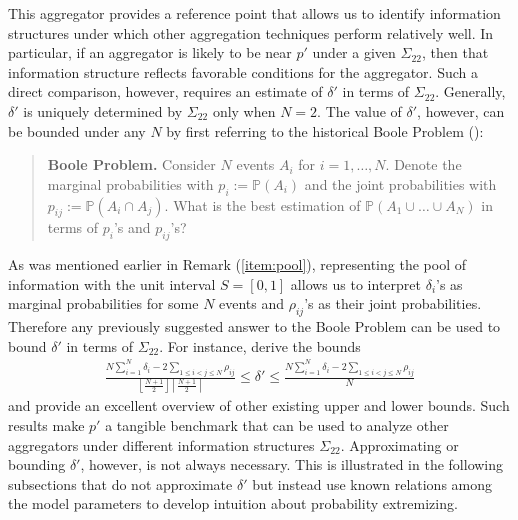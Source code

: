 \documentclass[11pt]{article}
\renewcommand{\P}{\mathbb{P}}
\theoremstyle{definition}
\theoremstyle{definition}
\def\P{{\mathbb P}}
\begin{document}
This aggregator provides a reference point that allows us to identify information structures under which other aggregation techniques perform relatively well. In particular, if an aggregator is likely to be near $p'$ under a given $\Sigma_{22}$, then that information structure reflects favorable conditions for the aggregator. Such a direct comparison, however, requires an estimate of $\delta'$ in terms of $\Sigma_{22}$. Generally, $\delta'$ is uniquely determined by $\Sigma_{22}$ only when $N = 2$. 
The value of $\delta'$, however, can be bounded under any $N$ by first referring to the historical Boole Problem (\citealt{boole1854investigation}): 

\begin{quote}
\textbf{Boole Problem.} Consider $N$ events $A_i$ for $i = 1, \dots, N$. Denote the marginal probabilities  with $p_i := \P(A_i)$ and the joint probabilities with $p_{ij} := \P(A_i \cap A_j)$. What is the best estimation of $\P(A_1 \cup \dots \cup A_N)$ in terms of $p_i$'s and $p_{ij}$'s?
\end{quote}
As was mentioned earlier in Remark (\ref{item:pool}), representing the pool of information with the unit interval $S = [0,1]$ allows us to interpret $\delta_i$'s as marginal probabilities for some $N$ events and $\rho_{ij}$'s as their joint probabilities. Therefore  any previously suggested answer to the Boole Problem can be used to bound $\delta'$ in terms of $\Sigma_{22}$. For instance, \cite{deza1997geometry} derive the bounds
\begin{align*}
\frac{N \sum_{i=1}^N \delta_i - 2 \sum_{1 \leq i < j \leq N} \rho_{ij}}{\left\lfloor \frac{N+1}{2} \right\rfloor \left\lceil \frac{N+1}{2} \right\rceil }  \leq \delta' \leq \frac{N \sum_{i=1}^N \delta_i - 2 \sum_{1 \leq i < j \leq N} \rho_{ij}}{N} 
\end{align*}
and provide an excellent overview of other existing upper and lower bounds. 
Such results make $p'$ a tangible benchmark that can be used to analyze other aggregators under different information structures $\Sigma_{22}$. Approximating or bounding $\delta'$, however, is not always necessary. This is illustrated in the following subsections that do not approximate $\delta'$ but instead use known relations among the model parameters to develop intuition about probability extremizing. 
\end{document}
